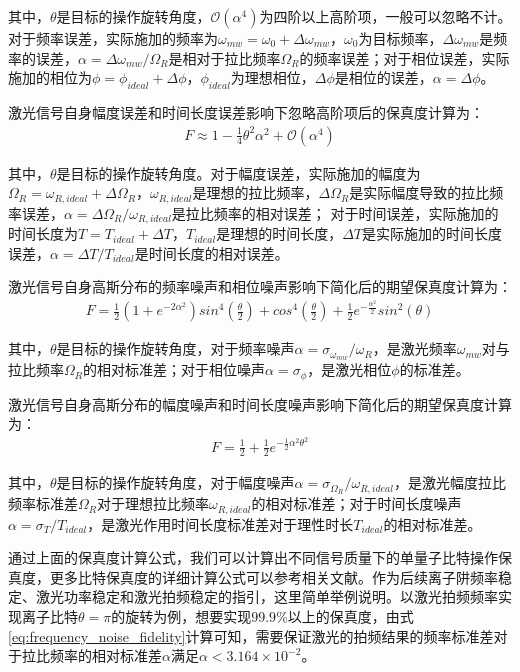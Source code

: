 其中，$\theta$是目标的操作旋转角度，$\mathcal{O}\left(\alpha^4\right)$为四阶以上高阶项，一般可以忽略不计。对于频率误差，实际施加的频率为$\omega_{mw}=\omega_0+\Delta\omega_{mw}$，$\omega_0$为目标频率，$\Delta\omega_{mw}$是频率的误差，$\alpha=\Delta\omega_{mw}/\Omega_R$是相对于拉比频率$\Omega_R$的频率误差；对于相位误差，实际施加的相位为$\phi=\phi_{ideal}+\Delta\phi$，$\phi_{ideal}$为理想相位，$\Delta\phi$是相位的误差，$\alpha=\Delta\phi$。

激光信号自身幅度误差和时间长度误差影响下忽略高阶项后的保真度计算为：
\begin{align}
    F\approx 1-\frac{1}{4}\theta^2\alpha^2+\mathcal{O}\left(\alpha^4\right)
\end{align}

其中，$\theta$是目标的操作旋转角度。对于幅度误差，实际施加的幅度为$\Omega_R=\omega_{R,ideal}+\Delta\Omega_R$，$\omega_{R,ideal}$是理想的拉比频率，$\Delta\Omega_R$是实际幅度导致的拉比频率误差，$\alpha=\Delta\Omega_R/\omega_{R,ideal}$是拉比频率的相对误差；
对于时间误差，实际施加的时间长度为$T=T_{ideal}+\Delta T$，$T_{ideal}$是理想的时间长度，$\Delta T$是实际施加的时间长度误差，$\alpha=\Delta T/T_{ideal}$是时间长度的相对误差。

激光信号自身高斯分布的频率噪声和相位噪声影响下简化后的期望保真度计算为：
\begin{align}
    F=\frac{1}{2}\left(1+e^{-2\alpha^2}\right) sin^4\left(\frac{\theta}{2}\right)+cos^4\left(\frac{\theta}{2}\right)+\frac{1}{2} e^{-\frac{\alpha^2}{2}} sin^2\left(\theta\right)\label{eq:frequency_noise_fidelity}
\end{align}

其中，$\theta$是目标的操作旋转角度，对于频率噪声$\alpha=\sigma_{\omega_{mw}}/\omega_{R}$，是激光频率$\omega_{mw}$对与拉比频率$\Omega_R$的相对标准差；对于相位噪声$\alpha=\sigma_{\phi}$，是激光相位$\phi$的标准差。

激光信号自身高斯分布的幅度噪声和时间长度噪声影响下简化后的期望保真度计算为：
\begin{align}
    F=\frac{1}{2}+\frac{1}{2} e^{-\frac{1}{2}\alpha^2\theta^2}\label{eq:amplitude_noise_fidelity}
\end{align}

其中，$\theta$是目标的操作旋转角度，对于幅度噪声$\alpha=\sigma_{\Omega_R}/\omega_{R,ideal}$，是激光幅度拉比频率标准差$\Omega_R$对于理想拉比频率$\omega_{R,ideal}$的相对标准差；对于时间长度噪声$\alpha=\sigma_{T}/T_{ideal}$，是激光作用时间长度标准差对于理性时长$T_{ideal}$的相对标准差。

通过上面的保真度计算公式，我们可以计算出不同信号质量下的单量子比特操作保真度，更多比特保真度的详细计算公式可以参考相关文献\cite[]{van_Dijk_Kawakami_Schouten_Veldhorst_Vandersypen_Babaie_Charbon_Sebastiano_2019}。作为后续离子阱频率稳定、激光功率稳定和激光拍频稳定的指引，这里简单举例说明。以激光拍频频率实现离子比特$\theta=\pi$的旋转为例，想要实现$99.9\%$以上的保真度，由式\eqref{eq:frequency_noise_fidelity}计算可知，需要保证激光的拍频结果的频率标准差对于拉比频率的相对标准差$\alpha$满足$\alpha < 3.164\times10^{-2}$。


